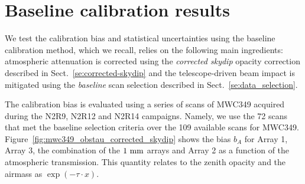 

\section{Baseline calibration results}%
\label{se:photometry_baseline}

We test the calibration bias and statistical uncertainties using the
baseline calibration method, which we recall, relies on the following
main ingredients: atmospheric attenuation is corrected using
the \emph{corrected skydip} opacity correction described in
Sect.~\ref{se:corrected-skydip}
and the telescope-driven beam impact is mitigated using the
\emph{baseline} scan selection described in
Sect.~\ref{se:data_selection}.

The calibration bias is evaluated using a series of scans of MWC349
acquired during the N2R9, N2R12 and N2R14 campaigns. Namely, we use
the 72 scans that met the baseline selection criteria over the 109
available scans for MWC349.
Figure~\ref{fig:mwc349_obstau_corrected_skydip} shows the
bias $b_A$ for Array 1, Array 3, the combination of the $1~\rm{mm}$ arrays and
Array 2 as a function of the atmospheric transmission. This quantity
relates to the zenith opacity and the airmass as
$\exp \left( - \tau \cdot x \right) $.


